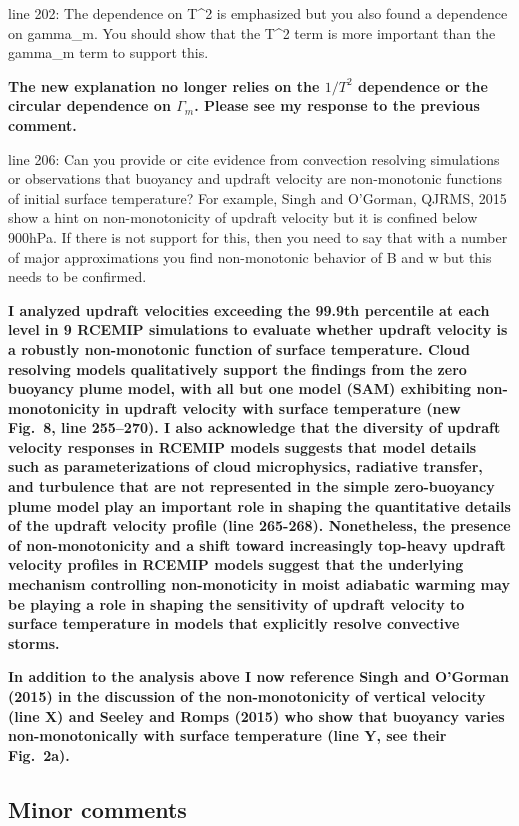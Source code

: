 \documentclass{article}
\begin{document}
\par
line 202: The dependence on T\^{}2 is emphasized but you also found a dependence on gamma\_m. You should show that the T\^{}2 term is more important than the gamma\_m term to support this.
\par
\textbf{The new explanation no longer relies on the $1/T^2$ dependence or the circular dependence on $\Gamma_m$. Please see my response to the previous comment.}
\par
line 206: Can you provide or cite evidence from convection resolving simulations or observations that buoyancy and updraft velocity are non-monotonic functions of initial surface temperature? For example, Singh and O'Gorman, QJRMS, 2015 show a hint on non-monotonicity of updraft velocity but it is confined below 900hPa. If there is not support for this, then you need to say that with a number of major approximations you find non-monotonic behavior of B and w but this needs to be confirmed.
\par
\textbf{I analyzed updraft velocities exceeding the 99.9th percentile at each level in 9 RCEMIP simulations to evaluate whether updraft velocity is a robustly non-monotonic function of surface temperature. Cloud resolving models qualitatively support the findings from the zero buoyancy plume model, with all but one model (SAM) exhibiting non-monotonicity in updraft velocity with surface temperature (new Fig.~8, line 255--270). I also acknowledge that the diversity of updraft velocity responses in RCEMIP models suggests that model details such as parameterizations of cloud microphysics, radiative transfer, and turbulence that are not represented in the simple zero-buoyancy plume model play an important role in shaping the quantitative details of the updraft velocity profile (line 265-268). Nonetheless, the presence of non-monotonicity and a shift toward increasingly top-heavy updraft velocity profiles in RCEMIP models suggest that the underlying mechanism controlling non-monoticity in moist adiabatic warming may be playing a role in shaping the sensitivity of updraft velocity to surface temperature in models that explicitly resolve convective storms.}
\par
\textbf{In addition to the analysis above I now reference Singh and O'Gorman (2015) in the discussion of the non-monotonicity of vertical velocity (line X) and Seeley and Romps (2015) who show that buoyancy varies non-monotonically with surface temperature (line Y, see their Fig.~2a).}

\subsection{Minor comments}
\end{document}
